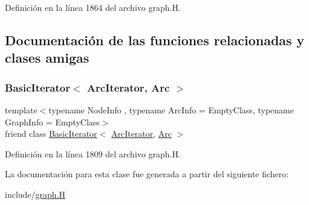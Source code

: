 Definición en la línea 1864 del archivo graph.\+H.



\subsection{Documentación de las funciones relacionadas y clases amigas}
\mbox{\label{class_designar_1_1_digraph_1_1_arc_iterator_a530ad7c7218fa9b74a5cce004d0e3a1c}} 
\subsubsection{\texorpdfstring{Basic\+Iterator$<$ Arc\+Iterator, Arc $>$}{BasicIterator< ArcIterator, Arc >}}
{\footnotesize\ttfamily template$<$typename Node\+Info , typename Arc\+Info  = Empty\+Class, typename Graph\+Info  = Empty\+Class$>$ \\
friend class \hyperlink{class_designar_1_1_basic_iterator}{Basic\+Iterator}$<$ \hyperlink{class_designar_1_1_digraph_1_1_arc_iterator}{Arc\+Iterator}, \hyperlink{class_designar_1_1_digraph_a0ceb278671f2a535c00fddccdeafd69f}{Arc} $>$\hspace{0.3cm}{\ttfamily [friend]}}



Definición en la línea 1809 del archivo graph.\+H.



La documentación para esta clase fue generada a partir del siguiente fichero\+:\begin{DoxyCompactItemize}
\item 
include/\hyperlink{graph_8_h}{graph.\+H}\end{DoxyCompactItemize}
